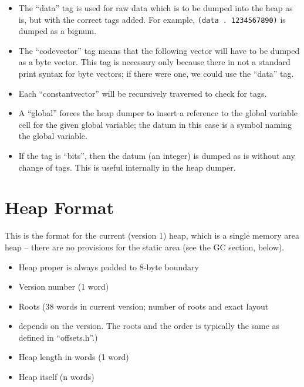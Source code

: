\begin{itemize}
\item
The ``data'' tag is used for raw data which is to be dumped
into the heap as is, but with the correct tags added. For example,
\verb+(data . 1234567890)+ is dumped as a bignum.

\item
The ``codevector'' tag means that the following vector will have to be dumped
as a byte vector. This tag is necessary only because there in not a standard
print syntax for byte vectors; if there were one, we could use the ``data''
tag.

\item
Each ``constantvector'' will be recursively traversed to check for tags.

\item
A ``global'' forces the heap dumper to insert a reference to the global
variable cell for the given global variable; the datum in this case is
a symbol naming the global variable.

\item
If the tag is ``bits'', then the datum (an integer) is dumped as is without 
any change of tags. This is useful internally in the heap dumper.

\end{itemize}

\section{Heap Format}

This is the format for the current (version 1) heap, which is a single memory
area heap -- there are no provisions for the static area (see the GC section,
below).

\begin{itemize}
\item Heap proper is always padded to 8-byte boundary
\item Version number (1 word)
\item Roots (38 words in current version; number of roots and exact layout
\item depends on the version. The roots and the order is typically the same
as defined in ``offsets.h''.)
\item Heap length in words (1 word)
\item Heap itself (n words)
\end{itemize}


